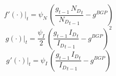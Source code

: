 \documentclass[10pt,a4paper]{article}
\begin{document}
\begin{dmath}
{\left.       f^‎{\prime}\left( \cdot \right)   \right|}_{t}=\psi_N\, \left(\frac{{g}_{t-1}\, {N_D}_{t}}{{N_D}_{t-1}}-g^{BGP}\right)
\end{dmath}
\begin{dmath}
{\left.       g\left( \cdot \right)            \right|}_{t}=\frac{\psi_I}{2}\, \left(\frac{{g}_{t-1}\, {I_D}_{t}}{{I_D}_{t-1}}-g^{BGP}\right)^{2}
\end{dmath}
\begin{dmath}
{\left.       g^‎{\prime}\left( \cdot \right)   \right|}_{t}=\psi_I\, \left(\frac{{g}_{t-1}\, {I_D}_{t}}{{I_D}_{t-1}}-g^{BGP}\right)
\end{dmath}
\end{document}
